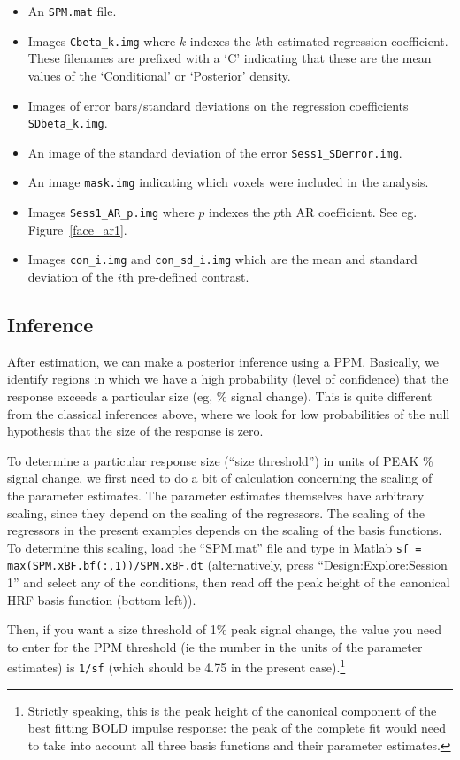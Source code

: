 \documentclass[a4paper,titlepage]{book}
\newcommand{\bi}{\begin{itemize}}
\newcommand{\ei}{\end{itemize}}
\begin{document}
\bi
\item{An \verb!SPM.mat! file.}
\item{Images   \verb!Cbeta_k.img! where $k$ indexes the $k$th estimated regression coefficient. These filenames are prefixed with a `C' indicating that these
are the mean values of the `Conditional' or `Posterior' density.}
\item{Images of error bars/standard deviations on the regression coefficients \verb!SDbeta_k.img!.}
\item{An image of the standard deviation of the 
error \verb!Sess1_SDerror.img!.}
\item{An image \verb!mask.img! indicating which voxels 
were included in the analysis.}
\item{Images \verb!Sess1_AR_p.img! where $p$ indexes the $p$th AR coefficient. See eg. Figure~\ref{face_ar1}.}
\item{Images \verb!con_i.img! and \verb!con_sd_i.img! which are the mean and standard deviation of the $i$th pre-defined contrast.} 
\ei

\subsection{Inference}

After estimation, we can make a posterior inference using a PPM. Basically, we identify regions in which we have a high probability (level of confidence) that the response exceeds a particular size (eg, \% signal change). This is quite different from the classical inferences above, where we look for low probabilities of the null hypothesis that the size of the response is zero.

To determine a particular response size (``size threshold'') in units of PEAK \% signal change, we first need to do a bit of calculation concerning the scaling of the parameter estimates. The parameter estimates themselves have arbitrary scaling, since they depend on the scaling of the regressors. The scaling of the regressors in the present examples depends on the scaling of the basis functions. To determine this scaling, load the ``SPM.mat'' file and type in Matlab \verb!sf = max(SPM.xBF.bf(:,1))/SPM.xBF.dt! (alternatively, press ``Design:Explore:Session 1'' and select any of the conditions, then read off the peak height of the canonical HRF basis function (bottom left)).

Then, if you want a size threshold of 1\% peak signal change, the value you need to enter for the PPM threshold (ie the number in the units of the parameter estimates) is \verb!1/sf! (which should be 4.75 in the present case).\footnote{Strictly speaking, this is the peak height of the canonical component of the best fitting BOLD impulse response: the peak of the complete fit would need to take into account all three basis functions and their parameter estimates.}
\end{document}
